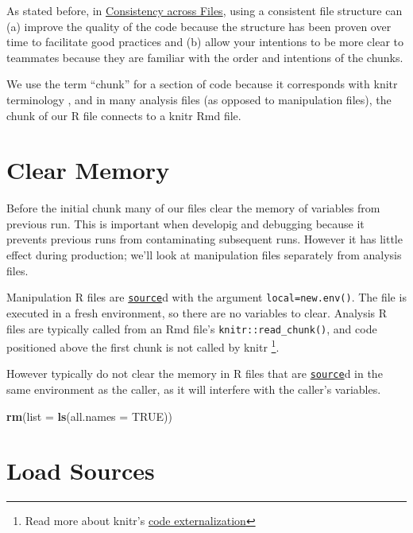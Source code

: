 \documentclass[]{book}
\newenvironment{Shaded}{\begin{snugshade}}{\end{snugshade}}
\newcommand{\DataTypeTok}[1]{\textcolor[rgb]{0.13,0.29,0.53}{#1}}
\newcommand{\KeywordTok}[1]{\textcolor[rgb]{0.13,0.29,0.53}{\textbf{#1}}}
\newcommand{\NormalTok}[1]{#1}
\newcommand{\OtherTok}[1]{\textcolor[rgb]{0.56,0.35,0.01}{#1}}
\let\rmarkdownfootnote\footnote%
\def\footnote{\protect\rmarkdownfootnote}
\begin{document}
As stated before, in \protect\hyperlink{consistency-files}{Consistency across Files}, using a consistent file structure can (a) improve the quality of the code because the structure has been proven over time to facilitate good practices and (b) allow your intentions to be more clear to teammates because they are familiar with the order and intentions of the chunks.

We use the term ``chunk'' for a section of code because it corresponds with knitr terminology \citep{xie2015}, and in many analysis files (as opposed to manipulation files), the chunk of our R file connects to a knitr Rmd file.

\hypertarget{clear-memory}{%
\section{Clear Memory}\label{clear-memory}}

Before the initial chunk many of our files clear the memory of variables from previous run. This is important when developig and debugging because it prevents previous runs from contaminating subsequent runs. However it has little effect during production; we'll look at manipulation files separately from analysis files.

Manipulation R files are \href{https://stat.ethz.ch/R-manual/R-devel/library/base/html/source.html}{\texttt{source}}d with the argument \texttt{local=new.env()}. The file is executed in a fresh environment, so there are no variables to clear. Analysis R files are typically called from an Rmd file's \texttt{knitr::read\_chunk()}, and code positioned above the first chunk is not called by knitr \footnote{Read more about knitr's \href{https://yihui.name/knitr/demo/externalization/}{code externalization}}.

However typically do not clear the memory in R files that are \href{https://stat.ethz.ch/R-manual/R-devel/library/base/html/source.html}{\texttt{source}}d in the same environment as the caller, as it will interfere with the caller's variables.

\begin{Shaded}
\begin{Highlighting}[]
\KeywordTok{rm}\NormalTok{(}\DataTypeTok{list =} \KeywordTok{ls}\NormalTok{(}\DataTypeTok{all.names =} \OtherTok{TRUE}\NormalTok{))}
\end{Highlighting}
\end{Shaded}

\hypertarget{load-sources}{%
\section{Load Sources}\label{load-sources}}
\end{document}
